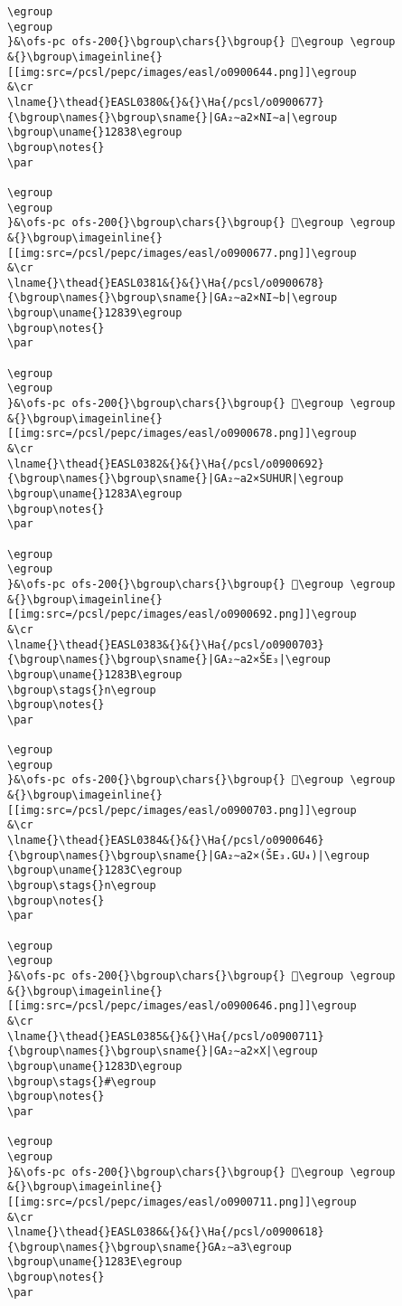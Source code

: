 \begin{verbatim}
\egroup
\egroup
}&\ofs-pc ofs-200{}\bgroup\chars{}\bgroup{} 𒠷\egroup \egroup
&{}\bgroup\imageinline{}[[img:src=/pcsl/pepc/images/easl/o0900644.png]]\egroup
&\cr
\lname{}\thead{}EASL0380&{}&{}\Ha{/pcsl/o0900677}{\bgroup\names{}\bgroup\sname{}|GA₂∼a2×NI∼a|\egroup
\bgroup\uname{}12838\egroup
\bgroup\notes{}
\par 

\egroup
\egroup
}&\ofs-pc ofs-200{}\bgroup\chars{}\bgroup{} 𒠸\egroup \egroup
&{}\bgroup\imageinline{}[[img:src=/pcsl/pepc/images/easl/o0900677.png]]\egroup
&\cr
\lname{}\thead{}EASL0381&{}&{}\Ha{/pcsl/o0900678}{\bgroup\names{}\bgroup\sname{}|GA₂∼a2×NI∼b|\egroup
\bgroup\uname{}12839\egroup
\bgroup\notes{}
\par 

\egroup
\egroup
}&\ofs-pc ofs-200{}\bgroup\chars{}\bgroup{} 𒠹\egroup \egroup
&{}\bgroup\imageinline{}[[img:src=/pcsl/pepc/images/easl/o0900678.png]]\egroup
&\cr
\lname{}\thead{}EASL0382&{}&{}\Ha{/pcsl/o0900692}{\bgroup\names{}\bgroup\sname{}|GA₂∼a2×SUHUR|\egroup
\bgroup\uname{}1283A\egroup
\bgroup\notes{}
\par 

\egroup
\egroup
}&\ofs-pc ofs-200{}\bgroup\chars{}\bgroup{} 𒠺\egroup \egroup
&{}\bgroup\imageinline{}[[img:src=/pcsl/pepc/images/easl/o0900692.png]]\egroup
&\cr
\lname{}\thead{}EASL0383&{}&{}\Ha{/pcsl/o0900703}{\bgroup\names{}\bgroup\sname{}|GA₂∼a2×ŠE₃|\egroup
\bgroup\uname{}1283B\egroup
\bgroup\stags{}n\egroup
\bgroup\notes{}
\par 

\egroup
\egroup
}&\ofs-pc ofs-200{}\bgroup\chars{}\bgroup{} 𒠻\egroup \egroup
&{}\bgroup\imageinline{}[[img:src=/pcsl/pepc/images/easl/o0900703.png]]\egroup
&\cr
\lname{}\thead{}EASL0384&{}&{}\Ha{/pcsl/o0900646}{\bgroup\names{}\bgroup\sname{}|GA₂∼a2×(ŠE₃.GU₄)|\egroup
\bgroup\uname{}1283C\egroup
\bgroup\stags{}n\egroup
\bgroup\notes{}
\par 

\egroup
\egroup
}&\ofs-pc ofs-200{}\bgroup\chars{}\bgroup{} 𒠼\egroup \egroup
&{}\bgroup\imageinline{}[[img:src=/pcsl/pepc/images/easl/o0900646.png]]\egroup
&\cr
\lname{}\thead{}EASL0385&{}&{}\Ha{/pcsl/o0900711}{\bgroup\names{}\bgroup\sname{}|GA₂∼a2×X|\egroup
\bgroup\uname{}1283D\egroup
\bgroup\stags{}#\egroup
\bgroup\notes{}
\par 

\egroup
\egroup
}&\ofs-pc ofs-200{}\bgroup\chars{}\bgroup{} 𒠽\egroup \egroup
&{}\bgroup\imageinline{}[[img:src=/pcsl/pepc/images/easl/o0900711.png]]\egroup
&\cr
\lname{}\thead{}EASL0386&{}&{}\Ha{/pcsl/o0900618}{\bgroup\names{}\bgroup\sname{}GA₂∼a3\egroup
\bgroup\uname{}1283E\egroup
\bgroup\notes{}
\par 


\end{verbatim}
